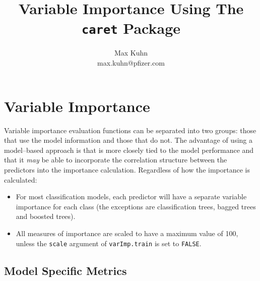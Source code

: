 \documentclass[12pt]{article}
\title{ Variable Importance Using The {\tt caret} Package}
\author{Max Kuhn \\ max.kuhn@pfizer.com}
\begin{document}
\maketitle

\thispagestyle{empty}


\section{Variable Importance}

Variable importance evaluation functions can be separated into two groups: those that use the model information and those that do not. The advantage of using a model--based approach is that is more closely tied to the model performance and that it {\em may} be able to incorporate the correlation structure between the predictors into the importance calculation. Regardless of how the importance is calculated:
\begin{itemize}
\item For most classification models, each predictor will have a separate variable importance for each class (the exceptions are classification trees, bagged trees and boosted trees).
\item All measures of importance are scaled to have a maximum value of 100, unless the \texttt{scale} argument of \texttt{varImp.train} is set to \texttt{FALSE}.
\end{itemize}

\subsection{Model Specific Metrics}
\end{document}
